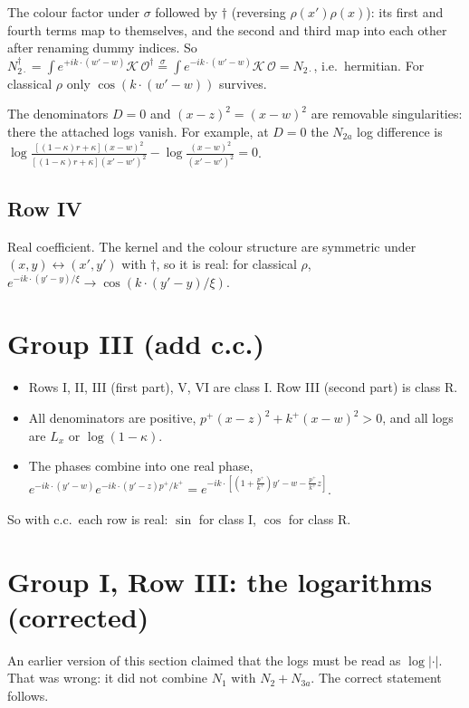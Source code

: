 \documentclass[10pt]{article}
\numberwithin{equation}{section}
\newcommand{\red}[1]{{\color{red}#1}}
\begin{document}
The colour factor under $\sigma$ followed by $\dagger$ (reversing $\rho(x')\rho(x)$): its first and fourth terms map to themselves, and the second and third map into each other after renaming dummy indices. So $N_{2\cdot}^\dagger=\int e^{+ik\cdot(w'-w)}\mathcal K\,\mathcal O^\dagger\overset{\sigma}{=}\int e^{-ik\cdot(w'-w)}\mathcal K\,\mathcal O=N_{2\cdot}$, i.e.\ hermitian. For classical $\rho$ only $\cos(k\cdot(w'-w))$ survives.

The denominators $D=0$ and $(x-z)^2=(x-w)^2$ are removable singularities: there the attached logs vanish. For example, at $D=0$ the $N_{2a}$ log difference is $\log\frac{[(1-\kappa)r+\kappa](x-w)^2}{[(1-\kappa)r+\kappa](x'-w')^2}-\log\frac{(x-w)^2}{(x'-w')^2}=0$.

\subsection{Row IV}
Real coefficient. The kernel and the colour structure are symmetric under $(x,y)\leftrightarrow(x',y')$ with $\dagger$, so it is real: for classical $\rho$, $e^{-ik\cdot(y'-y)/\xi}\to\cos(k\cdot(y'-y)/\xi)$.

\section{Group III (add c.c.)}
\begin{itemize}
\item Rows I, II, III (first part), V, VI are class I. Row III (second part) is class R.
\item All denominators are positive, $p^+(x-z)^2+k^+(x-w)^2>0$, and all logs are $L_x$ or $\log(1-\kappa)$.
\item The phases combine into one real phase, $e^{-ik\cdot(y'-w)}e^{-ik\cdot(y'-z)p^+/k^+}=e^{-ik\cdot[(1+\frac{p^+}{k^+})y'-w-\frac{p^+}{k^+}z]}$.
\end{itemize}
So with c.c.\ each row is real: $\sin$ for class I, $\cos$ for class R.

\section{Group I, Row III: the logarithms (corrected)}
\red{An earlier version of this section claimed that the logs must be read as $\log|\cdot|$. That was wrong: it did not combine $N_1$ with $N_2+N_{3a}$. The correct statement follows.}
\end{document}
